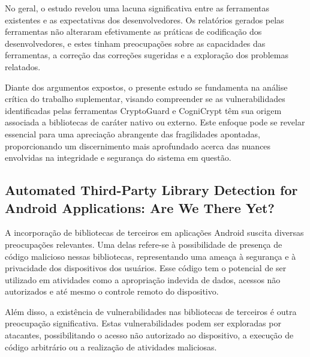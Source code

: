 No geral, o estudo revelou uma lacuna significativa entre as ferramentas existentes e as expectativas dos desenvolvedores. Os relatórios gerados pelas ferramentas não alteraram efetivamente as práticas de codificação dos desenvolvedores, e estes tinham preocupações sobre as capacidades das ferramentas, a correção das correções sugeridas e a exploração dos problemas relatados.



Diante dos argumentos expostos, o presente estudo se fundamenta na análise crítica do trabalho suplementar, visando compreender se as vulnerabilidades identificadas pelas ferramentas CryptoGuard e CogniCrypt têm sua origem associada a bibliotecas de caráter nativo ou externo. Este enfoque pode se revelar essencial para uma apreciação abrangente das fragilidades apontadas, proporcionando um discernimento mais aprofundado acerca das nuances envolvidas na integridade e segurança do sistema em questão.

\subsection{Automated Third-Party Library Detection for Android Applications: Are We There Yet?} %

A incorporação de bibliotecas de terceiros em aplicações Android suscita diversas preocupações relevantes. Uma delas refere-se à possibilidade de presença de código malicioso nessas bibliotecas, representando uma ameaça à segurança e à privacidade dos dispositivos dos usuários. Esse código tem o potencial de ser utilizado em atividades como a apropriação indevida de dados, acessos não autorizados e até mesmo o controle remoto do dispositivo.

Além disso, a existência de vulnerabilidades nas bibliotecas de terceiros é outra preocupação significativa. Estas vulnerabilidades podem ser exploradas por atacantes, possibilitando o acesso não autorizado ao dispositivo, a execução de código arbitrário ou a realização de atividades maliciosas.

